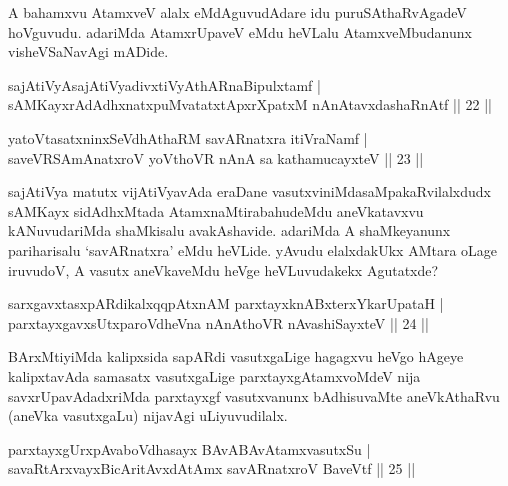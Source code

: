 \begin{artha}
A bahamxvu AtamxveV alalx eMdAguvudAdare idu puruSAthaRvAgadeV hoVguvudu. adariMda AtamxrUpaveV eMdu heVLalu 
AtamxveMbudanunx visheVSaNavAgi mADide.
\end{artha}


\begin{shl}
sajAtiVyAsajAtiVyadivxtiVyAthARnaBipulxtamf |\\
sAMKayxrAdAdhxnatxpuMvatatxtApxrXpatxM nAnAtavxdashaRnAtf \hfill || 22 ||
\end{shl}

\begin{shl}
yatoV\s tasatxninxSeVdhAthaRM savARnatxra itiVraNamf |\\
saveVRSAmAnatxroV yoV\s thoVR nAnA sa kathamucayxteV \hfill || 23 ||
\end{shl}

\begin{artha}
sajAtiVya matutx vijAtiVyavAda eraDane vasutxviniMda\break saMpakaRvilalxdudx sAMKayx sidAdhxMtada AtamxnaMtirabahudeMdu\break
aneVkatavxvu kANuvudariMda shaMkisalu avakAshavide. adariMda A shaMkeyanunx pariharisalu `savARnatxra' eMdu heVLide. yAvudu elalxdakUkx AMtara oLage iruvudoV, A vasutx aneVkaveMdu heVge heVLuvudakekx Agutatxde?
\end{artha}


\begin{shl}
sarxgavxtasxpARdikalxqqpAtxnAM parxtayxknABxterxYkarUpataH |\\
parxtayxgavxsUtxparoVdheVna nAnAthoVR nAvashiSayxteV \hfill || 24 ||
\end{shl}

\begin{artha}%
BArxMtiyiMda kalipxsida sapARdi vasutxgaLige hagagxvu heVgo hAgeye kalipxtavAda samasatx vasutxgaLige parxtayxgAtamxvoMdeV nija savxrUpavAdadxriMda parxtayxgf vasutxvanunx bAdhisuvaMte aneVkAthaRvu (aneVka vasutxgaLu) nijavAgi uLiyuvudilalx.
\end{artha}


\begin{shl}
parxtayxgUrxpAvaboVdhasayx BAvABAvAtamxvasutxSu |\\
savaRtArxvayxBicAritAvxdAtAmx savARnatxroV BaveVtf \hfill || 25 ||
\end{shl}

